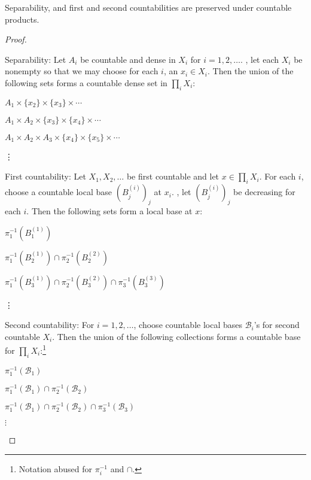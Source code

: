 	
	\begin{prp}
		Separability, and first and second countabilities are preserved under countable products.
	\end{prp}
	
	\begin{proof}
		\begin{mylist}
			\item Separability:
			Let $A_i$ be countable and dense in $X_i$ for $i = 1, 2, \ldots$. \Wlogg, let each $X_i$ be nonempty so that we may choose
			 for each $i$, an $x_i\in X_i$. Then the union of the following sets forms a countable dense set in $\prod_i X_i$:
			\begin{mylist}
				\item $A_1\times\{x_2\}\times\{x_3\}\times\cdots$
				\item $A_1\times A_2\times \{x_3\}\times\{x_4\}\times\cdots$
				\item $A_1\times A_2\times A_3\times \{x_4\}\times\{x_5\}\times\cdots$
				\item[\vdots] 
			\end{mylist}
			
			\item First countability:
			Let $X_1, X_2, \ldots$ be first countable and let $x\in \prod_i X_i$. For each $i$, choose a countable local base $(B^{(i)}_j)_j$ at $x_i$. \Wlogg, let $(B^{(i)}_j)_j$ be decreasing for each $i$. Then the following sets form a local base at $x$:
			\begin{mylist}
				\item $\pi_1^{-1}(B^{(1)}_1)$
				\item $\pi_1^{-1}(B^{(1)}_2)\cap \pi_2^{-1}(B^{(2)}_2)$
				\item $\pi_1^{-1}(B^{(1)}_3)\cap \pi_2^{-1}(B^{(2)}_3)\cap \pi_3^{-1}(B^{(3)}_3)$
				\item[\vdots]
			\end{mylist}
			
			\item Second countability: 
			For $i = 1, 2, \ldots$, choose countable local bases $\mathscr B_i$'s for second countable $X_i$. Then the union of the following collections forms a countable base for $\prod_i X_i$:\footnote{Notation abused for $\pi_i^{-1}$ and $\cap$.}
			\begin{mylist}
				\item $\pi_1^{-1}(\mathscr B_1)$
				\item $\pi_1^{-1}(\mathscr B_1)\cap\pi_2^{-1}(\mathscr B_2)$
				\item $\pi_1^{-1}(\mathscr B_1)\cap\pi_2^{-1}(\mathscr B_2)\cap\pi_3^{-1}(\mathscr B_3)$
				\item[$\vdots$]\qedhere
			\end{mylist}
		\end{mylist}
	\end{proof}
	
